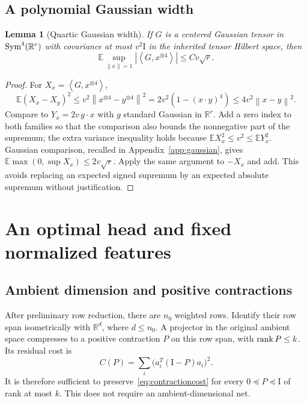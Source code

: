 \documentclass[11pt]{article}
\newtheorem{lemma}[theorem]{Lemma}
\theoremstyle{remark}\newtheorem{remark}[theorem]{Remark}
\newcommand{\R}{\mathbb R}\newcommand{\E}{\mathbb E}\newcommand{\Prob}{\mathbb P}
\newcommand{\norm}[1]{\left\lVert#1\right\rVert}\newcommand{\abs}[1]{\left|#1\right|}
\newcommand{\ip}[2]{\left\langle#1,#2\right\rangle}
\newcommand{\Id}{\mathrm I}\newcommand{\dbar}{\bar d}
\numberwithin{equation}{section}
\begin{document}
\subsection{A polynomial Gaussian width}
\begin{lemma}[Quartic Gaussian width]\label{lem:headwidth}
If $G$ is a centered Gaussian tensor in $\Sym^4(\R^r)$ with covariance at most $v^2\Id$ in the inherited tensor Hilbert space, then
\[
 \E\sup_{\norm x=1}\abs{\ip G{x^{\otimes4}}}\le C v\sqrt r.
\]
\end{lemma}
\begin{proof}
For $X_x=\ip G{x^{\otimes4}}$,
\[
 \E(X_x-X_y)^2\le v^2\norm{x^{\otimes4}-y^{\otimes4}}^2
 =2v^2(1-(x\cdot y)^4)\le4v^2\norm{x-y}^2.
\]
Compare to $Y_x=2v\,g\cdot x$ with $g$ standard Gaussian in $\R^r$. Add a zero index to both families so that the comparison also bounds the nonnegative part of the supremum; the extra variance inequality holds because $\E X_x^2\le v^2\le\E Y_x^2$. Gaussian comparison, recalled in Appendix~\ref{app:gaussian}, gives
$\E\max(0,\sup X_x)\le2v\sqrt r$. Apply the same argument to $-X_x$ and add. This avoids replacing an expected signed supremum by an expected absolute supremum without justification.
\end{proof}
\section{An optimal head and fixed normalized features}\label{sec:features}
\subsection{Ambient dimension and positive contractions}
After preliminary row reduction, there are $n_0$ weighted rows. Identify their row span isometrically with $\R^d$, where $d\le n_0$. A projector in the original ambient space compresses to a positive contraction $P$ on this row span, with $\operatorname{rank} P\le k$. Its residual cost is
\begin{equation}\label{eq:contractioncost}
 C(P)=\sum_i\bigl(a_i^T(\Id-P)a_i\bigr)^2.
\end{equation}
It is therefore sufficient to preserve~\eqref{eq:contractioncost} for every $0\preceq P\preceq\Id$ of rank at most $k$. This does not require an ambient-dimensional net.
\end{document}
